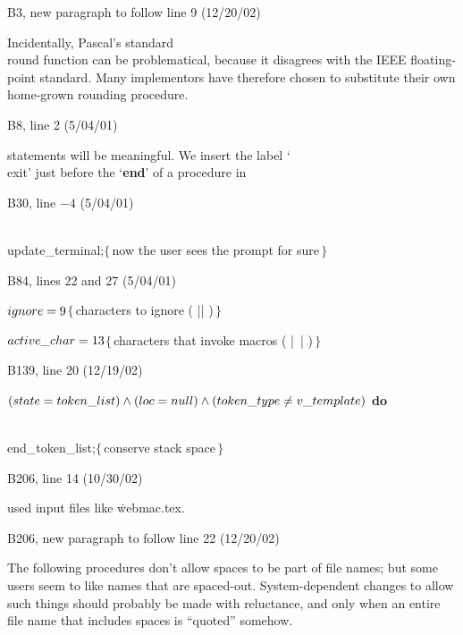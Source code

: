 {\bugonpage B3, new paragraph to follow line 9 (12/20/02)

\tenpoint\noindent\quad
Incidentally, Pascal's standard \\{round} function can be problematical,
because it disagrees with the IEEE floating-point standard.
Many implementors have
therefore chosen to substitute their own home-grown rounding procedure.

\bugonpage B8, line 2 (5/04/01)

\tenpoint\noindent
statements will be meaningful. We insert the label
`\\{exit}' just before the `{\bf end}' of a procedure in\cutpar

\bugonpage B30, line $-4$ (5/04/01)

\ninepoint\noindent
{} \\{update\_terminal};\quad$\{\,$now the user sees
 the prompt for sure$\,\}$

\bugonpage B84, lines 22 and 27 (5/04/01)

\ninepoint\noindent
\quad$\\{ignore}=9$\quad$\{\,$characters to ignore ( |^^@| )$\,\}$\par
\noindent
\quad$\\{active\_char}=13$\quad$\{\,$characters that invoke
 macros ( |~| )$\,\}$

\bugonpage B139, line 20 (12/19/02)

\ninepoint\noindent
{} $(\\{state}=\\{token\_list}) \land
 (\\{loc}=\\{null}) \land (\\{token\_type}\ne\\{v\_template})$ {\bf do}\par
\noindent\qquad\\{end\_token\_list};\quad$\{\,$conserve stack space$\,\}$

\bugonpage B206, line 14 (10/30/02)

\tenpoint\noindent
used input files like \.{webmac.tex}.

\bugonpage B206, new paragraph to follow line 22 (12/20/02)

\tenpoint\noindent\quad
The following procedures don't allow spaces to be part of
file names; but some users seem to like names that are spaced-out.
System-dependent changes to allow such things should probably
be made with reluctance, and only when an entire file name that
includes spaces is ``quoted'' somehow.

}

